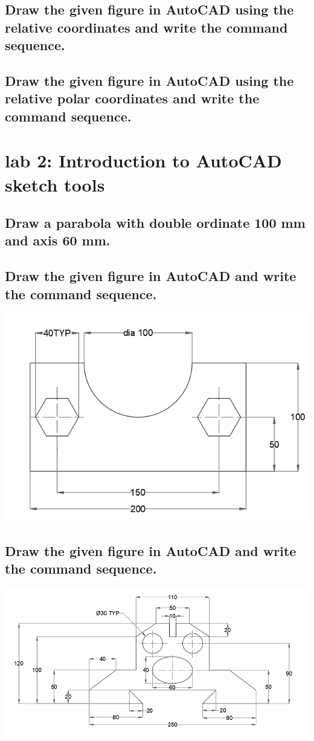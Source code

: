 \documentclass[a4paper, 12pt]{article}
\begin{document}
\subsection{Draw the given figure in AutoCAD using the relative coordinates and write the command sequence.}
\subsection{Draw the given figure in AutoCAD using the relative polar coordinates and write the command sequence.}
\clearpage
\section{lab 2: Introduction to AutoCAD sketch tools}
\subsection{Draw a parabola with double ordinate 100 mm and axis 60 mm. }
\subsection{Draw the given figure in AutoCAD and write the command sequence.}
\begin{center}
    \includegraphics{gfx/l2t2.PNG}
\end{center}
\subsection{Draw the given figure in AutoCAD and write the command sequence.}
\begin{center}
    \includegraphics[scale = 0.7]{gfx/l2t3.PNG}
\end{center}
\end{document}
